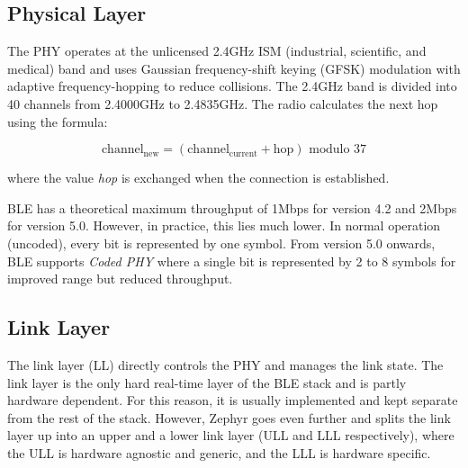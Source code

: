 \subsection{Physical Layer} The PHY operates at the unlicensed 2.4GHz ISM (industrial, scientific, and medical) band and uses Gaussian frequency-shift keying (GFSK) modulation with adaptive frequency-hopping to reduce collisions. The 2.4GHz band is divided into 40 channels from 2.4000GHz to 2.4835GHz. The radio calculates the next hop using the formula:

\[\text{channel}_{\text{new}} = (\text{channel}_{\text{current}} + \text{hop}) \text{ modulo } 37\]
    
where the value \textit{hop} is exchanged when the connection is established.

BLE has a theoretical maximum throughput of 1Mbps for version 4.2 and 2Mbps for version 5.0. However, in practice, this lies much lower. In normal operation (uncoded), every bit is represented by one symbol. From version 5.0 onwards, BLE supports \textit{Coded PHY} where a single bit is represented by 2 to 8 symbols for improved range but reduced throughput.

\subsection{Link Layer} 
The link layer (LL) directly controls the PHY and manages the link state. The link layer is the only hard real-time layer of the BLE stack and is partly hardware dependent. For this reason, it is usually implemented and kept separate from the rest of the stack. However, Zephyr goes even further and splits the link layer up into an upper and a lower link layer (ULL and LLL respectively), where the ULL is hardware agnostic and generic, and the LLL is hardware specific.

